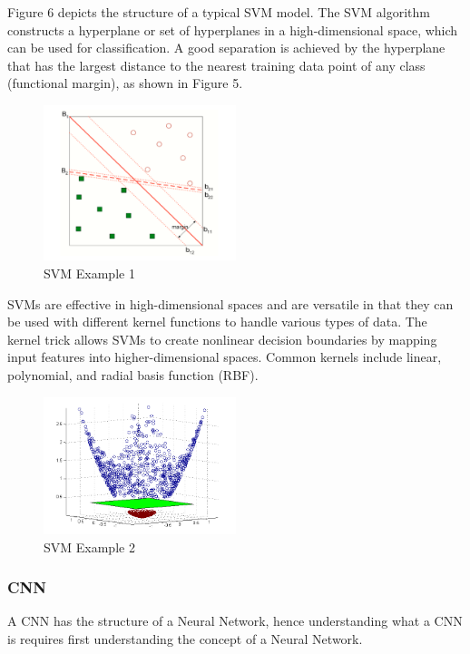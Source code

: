 \documentclass[conference]{IEEEtran}
\begin{document}
Figure 6 depicts the structure of a typical SVM model. The SVM algorithm constructs a hyperplane or set of hyperplanes in a high-dimensional space, which can be used for classification. A good separation is achieved by the hyperplane that has the largest distance to the nearest training data point of any class (functional margin), as shown in Figure 5.

\begin{figure}[H]
\centering
    \includegraphics[width=0.5\textwidth]{images/SVMExample.png}
    \caption{SVM Example 1}
\end{figure}

SVMs are effective in high-dimensional spaces and are versatile in that they can be used with different kernel functions to handle various types of data. The kernel trick allows SVMs to create nonlinear decision boundaries by mapping input features into higher-dimensional spaces. Common kernels include linear, polynomial, and radial basis function (RBF).

\begin{figure}[H]
\centering
    \includegraphics[width=0.5\textwidth]{images/SVMExample3D.png}
    \caption{SVM Example 2}
\end{figure}

\subsubsection{CNN}

A CNN has the structure of a Neural Network, hence understanding what a CNN is requires first understanding the concept of a Neural Network.
  
\end{document}
